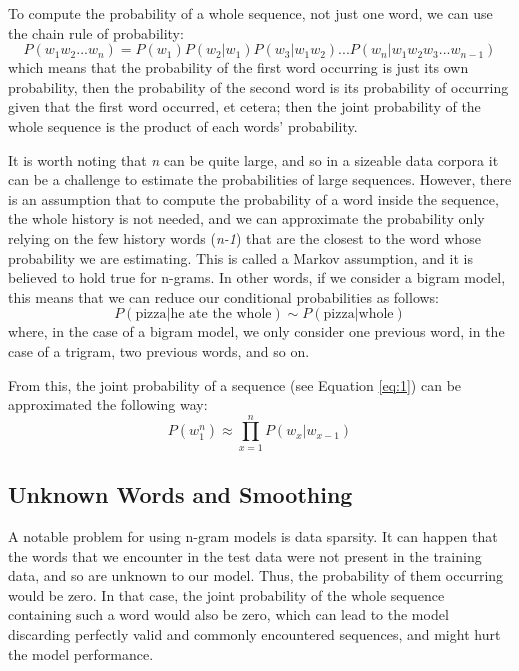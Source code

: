 \documentclass[sigplan,screen]{acmart}
\begin{document}
To compute the probability of a whole sequence, not just one word, we can use the chain rule of probability:
\begin{equation}
    P(w_1w_2...w_n) = P(w_1)P(w_2|w_1)P(w_3|w_1w_2)...P(w_n|w_1w_2w_3...w_{n-1})\label{eq:1}
\end{equation}
which means that the probability of the first word occurring is just its own probability, then the probability of the second word is its probability of occurring given that the first word occurred, et cetera; then the joint probability of the whole sequence is the product of each words' probability.

It is worth noting that \textit{n} can be quite large, and so in a sizeable data corpora it can be a challenge to estimate the probabilities of large sequences. However, there is an assumption that to compute the probability of a word inside the sequence, the whole history is not needed, and we can approximate the probability only relying on the few history words (\textit{n-1}) that are the closest to the word whose probability we are estimating. This is called a Markov assumption, and it is believed to hold true for n-grams. In other words, if we consider a bigram model, this means that we can reduce our conditional probabilities as follows:
\begin{equation}
    P(\text{pizza}|\text{he ate the whole}) \sim P(\text{pizza}|\text{whole})
\end{equation}
where, in the case of a bigram model, we only consider one previous word, in the case of a trigram, two previous words, and so on.

From this, the joint probability of a sequence (see Equation \ref{eq:1}) can be approximated the following way:
\begin{equation}
    P(w_1^n) \approx \prod_{x=1}^n P(w_x|w_{x-1})
\end{equation}

\subsection{Unknown Words and Smoothing}
A notable problem for using n-gram models is data sparsity. It can happen that the words that we encounter in the test data were not present in the training data, and so are unknown to our model. Thus, the probability of them occurring would be zero. In that case, the joint probability of the whole sequence containing such a word would also be zero, which can lead to the model discarding perfectly valid and commonly encountered sequences, and might hurt the model performance.
\end{document}
